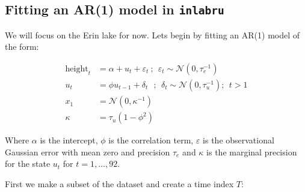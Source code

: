 \documentclass[
  letterpaper,
  DIV=11,
  numbers=noendperiod]{scrartcl}
\newenvironment{Shaded}{\begin{snugshade}}{\end{snugshade}}
\newcommand{\DecValTok}[1]{\textcolor[rgb]{0.68,0.00,0.00}{#1}}
\newcommand{\FunctionTok}[1]{\textcolor[rgb]{0.28,0.35,0.67}{#1}}
\newcommand{\NormalTok}[1]{\textcolor[rgb]{0.00,0.23,0.31}{#1}}
\newcommand{\OtherTok}[1]{\textcolor[rgb]{0.00,0.23,0.31}{#1}}
\newcommand{\SpecialCharTok}[1]{\textcolor[rgb]{0.37,0.37,0.37}{#1}}
\newcommand{\StringTok}[1]{\textcolor[rgb]{0.13,0.47,0.30}{#1}}
\begin{document}
\subsection{\texorpdfstring{Fitting an AR(1) model in
\texttt{inlabru}}{Fitting an AR(1) model in inlabru}}\label{fitting-an-ar1-model-in-inlabru}

We will focus on the Erin lake for now. Lets begin by fitting an AR(1)
model of the form:

\[
\begin{aligned}
\text{height}_t &= \alpha + u_t +\varepsilon_t~; ~~ \varepsilon_t\sim \mathcal{N}(0,\tau_e^{-1}) \\
u_t &= \phi u_{t-1} + \delta_t~~~ ; ~~ \delta_t \sim \mathcal{N}(0,\tau_u^{-1}); ~~ t > 1 \\
x_1 &= \mathcal{N}(0,\kappa^{-1})\\
\kappa &= \tau_u (1-\phi^2)
\end{aligned}
\]

Where \(\alpha\) is the intercept, \(\phi\) is the correlation term,
\(\varepsilon\) is the observational Gaussian error with mean zero and
precision \(\tau_e\) and \(\kappa\) is the marginal precision for the
state \(u_t\) for \(t= 1,\ldots,92\).

First we make a subset of the dataset and create a time index \(T\):

\begin{Shaded}
\end{Shaded}
\end{document}
